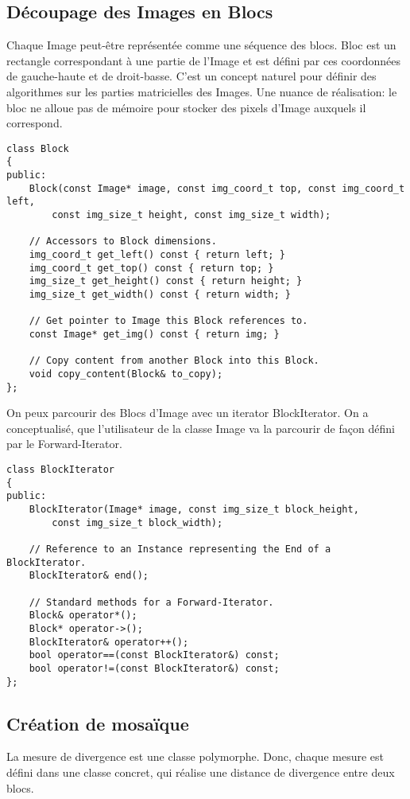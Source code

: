 \documentclass[a4paper]{article}
\begin{document}
\subsection{D\'ecoupage des Images en Blocs}
Chaque Image peut-\^etre repr\'esent\'ee comme une s\'equence des blocs.
Bloc est un rectangle correspondant \`a une partie de l'Image et est d\'efini par ces coordonn\'ees de gauche-haute et de droit-basse.
C'est un concept naturel pour d\'efinir des algorithmes sur les parties matricielles des Images.
Une nuance de r\'ealisation: le bloc ne alloue pas de m\'emoire pour stocker des pixels d'Image auxquels il correspond.

\begin{lstlisting}
class Block
{
public:
	Block(const Image* image, const img_coord_t top, const img_coord_t left,
		const img_size_t height, const img_size_t width);
		
	// Accessors to Block dimensions.
	img_coord_t get_left() const { return left; }
	img_coord_t get_top() const { return top; }
	img_size_t get_height() const { return height; }
	img_size_t get_width() const { return width; }
	
	// Get pointer to Image this Block references to.
	const Image* get_img() const { return img; }
	
	// Copy content from another Block into this Block.
	void copy_content(Block& to_copy);
};
\end{lstlisting}

On peux parcourir des Blocs d'Image avec un iterator BlockIterator.
On a conceptualis\'e, que l'utilisateur de la classe Image va la parcourir de fa\c{c}on d\'efini par le Forward-Iterator.

\begin{lstlisting}
class BlockIterator
{
public:
	BlockIterator(Image* image, const img_size_t block_height,
		const img_size_t block_width);

	// Reference to an Instance representing the End of a BlockIterator.	
	BlockIterator& end();

	// Standard methods for a Forward-Iterator.
	Block& operator*();
	Block* operator->();
	BlockIterator& operator++();
	bool operator==(const BlockIterator&) const;
	bool operator!=(const BlockIterator&) const;
};
\end{lstlisting}

\subsection{Cr\'eation de mosa\"ique}
La mesure de divergence est une classe polymorphe.
Donc, chaque mesure est d\'efini dans une classe concret, qui r\'ealise une distance de divergence entre deux blocs.
\end{document}
